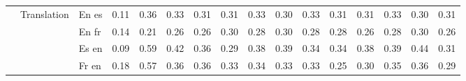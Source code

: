 \begin{center}
\begin{longtable}{lllrrrrrrrrrrrrr}
\cline{2-16}
 & \multirow[t]{4}{*}{Translation} & En es & 0.11 & 0.36 & 0.33 & 0.31 & 0.31 & 0.33 & 0.30 & 0.33 & 0.31 & 0.31 & 0.33 & 0.30 & 0.31 \\
 &  & En fr & 0.14 & 0.21 & 0.26 & 0.26 & 0.30 & 0.28 & 0.30 & 0.28 & 0.28 & 0.26 & 0.28 & 0.30 & 0.26 \\
 &  & Es en & 0.09 & 0.59 & 0.42 & 0.36 & 0.29 & 0.38 & 0.39 & 0.34 & 0.34 & 0.38 & 0.39 & 0.44 & 0.31 \\
 &  & Fr en & 0.18 & 0.57 & 0.36 & 0.36 & 0.33 & 0.34 & 0.33 & 0.33 & 0.25 & 0.30 & 0.35 & 0.36 & 0.29 \\
\cline{1-16} \cline{2-16}
\bottomrule
\end{longtable}

\end{center}
\twocolumn